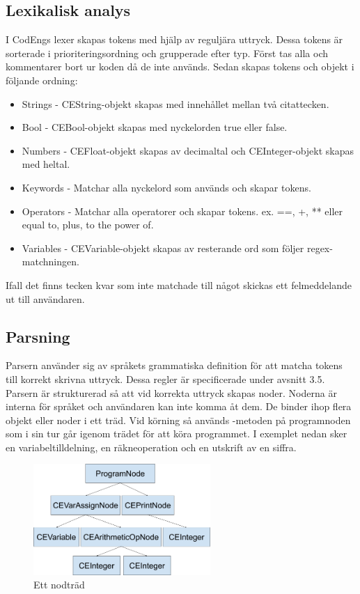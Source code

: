 \documentclass{article}
\begin{document}
\subsection{Lexikalisk analys}
I CodEngs lexer skapas tokens med hjälp av reguljära uttryck. Dessa tokens är sorterade i prioriteringsordning och grupperade efter typ. 
Först tas alla  och kommentarer bort ur koden då de inte används. Sedan skapas tokens och objekt i följande ordning:
\begin{itemize}
\item Strings - CEString-objekt skapas med innehållet mellan två citattecken.
\item Bool - CEBool-objekt skapas med nyckelorden true eller false.
\item Numbers - CEFloat-objekt skapas av decimaltal och CEInteger-objekt skapas med heltal.
\item Keywords - Matchar alla nyckelord som används och skapar tokens.
\item Operators - Matchar alla operatorer och skapar tokens. ex. ==, +, ** eller equal to, plus, to the power of.
\item Variables - CEVariable-objekt skapas av resterande ord som följer regex-matchningen.
\end{itemize}
Ifall det finns tecken kvar som inte matchade till något skickas ett felmeddelande ut till användaren.
\subsection{Parsning}
Parsern använder sig av språkets grammatiska definition för att matcha tokens till korrekt skrivna uttryck. Dessa regler är specificerade under avsnitt 3.5. \newline Parsern är strukturerad så att vid korrekta uttryck skapas noder. Noderna är interna för språket och användaren kan inte komma åt dem. De binder ihop flera objekt eller noder i ett träd. Vid körning så används -metoden på programnoden som i sin tur går igenom trädet för att köra programmet. I exemplet nedan sker en variabeltilldelning, en räkneoperation och en utskrift av en siffra.
\newpage
\newline \center\textbf{}
\center \textbf{}

\begin{figure}[h!]
    \centering
    \includegraphics[width=0.60\textwidth]{nodeuml.png}
    \caption{Ett nodträd}
\end{figure}
\end{document}
